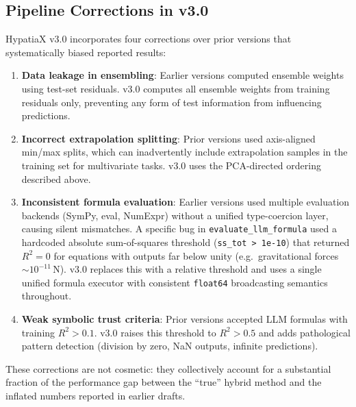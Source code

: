 \documentclass[twoside,11pt]{article}
\newcommand{\Rsq}{R^{2}}
\begin{document}
\subsection{Pipeline Corrections in v3.0}\label{subsec:pipeline-corrections-in-v30}
\label{sec:r2_bugfix}
\label{sec:corrections}

HypatiaX v3.0 incorporates four corrections over prior versions that systematically
biased reported results:

\begin{enumerate}[leftmargin=2em,label=\arabic*.]
  \item \textbf{Data leakage in ensembling}: Earlier versions computed ensemble
    weights using test-set residuals.  v3.0 computes all ensemble weights from
    training residuals only, preventing any form of test information from
    influencing predictions.

  \item \textbf{Incorrect extrapolation splitting}: Prior versions used axis-aligned
    min/max splits, which can inadvertently include extrapolation samples in the
    training set for multivariate tasks.  v3.0 uses the PCA-directed ordering
    described above.

  \item \textbf{Inconsistent formula evaluation}: Earlier
    versions used multiple evaluation backends (SymPy, eval, NumExpr) without a
    unified type-coercion layer, causing silent mismatches.  A specific bug in
    \texttt{evaluate\_llm\_formula} used a hardcoded absolute sum-of-squares
    threshold (\texttt{ss\_tot > 1e-10}) that returned $\Rsq = 0$ for equations
    with outputs far below unity (e.g.\ gravitational forces $\sim 10^{-11}$\,N).
    v3.0 replaces this with a relative threshold and uses a single unified formula
    executor with consistent \texttt{float64} broadcasting semantics throughout.

  \item \textbf{Weak symbolic trust criteria}: Prior versions accepted LLM formulas
    with training $\Rsq > 0.1$.  v3.0 raises this threshold to $\Rsq > 0.5$ and
    adds pathological pattern detection (division by zero, NaN outputs, infinite
    predictions).
\end{enumerate}

These corrections are not cosmetic: they collectively account for a substantial
fraction of the performance gap between the ``true'' hybrid method and the inflated
numbers reported in earlier drafts.
\end{document}

